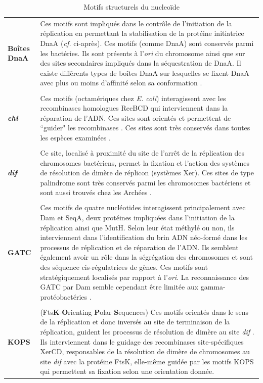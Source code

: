 \begin{longtable}{@{\hspace{-2cm}\hspace{1cm}} >{\bfseries}p{}  | >{\small}p{}}
 	 \caption{Motifs structurels du nucleoïde}\label{tabmotif}\\
	 \endfirsthead
	 Boîtes DnaA & Ces motifs sont impliqués dans le contrôle de l'initiation de la réplication en permettant la stabilisation de la protéine initiatrice DnaA (\textit{cf.} ci-après). Ces motifs (comme DnaA) sont conservés parmi les bactéries. Ils sont présents à l'\textit{ori} du chromosome ainsi que sur des sites secondaires impliqués dans la séquestration de DnaA. Il existe différents types de boîtes DnaA sur lesquelles se fixent DnaA avec plus ou moins d'affinité selon sa conformation \citep{Mott2007}.\\
	\\[-0.2cm]
	\textit{chi} & Ces motifs (octamériques chez \textit{E. coli}) interagissent avec les recombinases homologues RecBCD qui interviennent dans la réparation de l'ADN. Ces sites sont orientés et permettent de ``guider" les recombinases \citep{spies2005homologous}. Ces sites sont très conservés dans toutes les espèces examinées \citep{Touzain2011}.\\
	\\[-0.2cm]
	\textit{dif} & Ce site, localisé à proximité du site de l'arrêt de la réplication des chromosomes bactériens, permet la fixation et l'action des systèmes de résolution de dimère de réplicon (systèmes Xer). Ces sites de type palindrome sont très conservés parmi les chromosomes bactériens et sont aussi trouvés chez les Archées \citep{Carnoy2009}. \\
	\\[-0.2cm]
	 GATC & Ces motifs de quatre nucléotides interagissent principalement avec Dam et SeqA, deux protéines impliquées dans l'initiation de la réplication ainsi que MutH. Selon leur état méthylé ou non, ils interviennent dans l'identification du brin ADN néo-formé dans les processus de réplication et de réparation de l'ADN. Ils semblent également avoir un rôle dans la ségrégation des chromosomes et sont des séquence cis-régulatrices de gènes. Ces motifs sont stratégiquement localisés par rapport à l'\textit{ori}. La reconnaissance des GATC par Dam semble cependant être limitée aux gamma-protéobactéries \citep{Touzain2011}.\\
	\\[-0.2cm]
	KOPS & (Fts\textbf{K}-\textbf{O}rienting\textbf{ P}olar \textbf{S}equences) Ces motifs orientés dans le sens de la réplication et donc inversés au site de terminaison de la réplication\citep{Kono2011}, guident les processus de résolution de dimère au site \textit{dif} \citep{bigot2005kops}. Ils interviennent dans le guidage des recombinases site-spécifiques XerCD, responsables de la résolution de dimère de chromosomes au site \textit{dif} avec la protéine FtsK, elle-même guidée par les motifs KOPS qui permettent sa fixation selon une orientation donnée. \\

\end{longtable}
